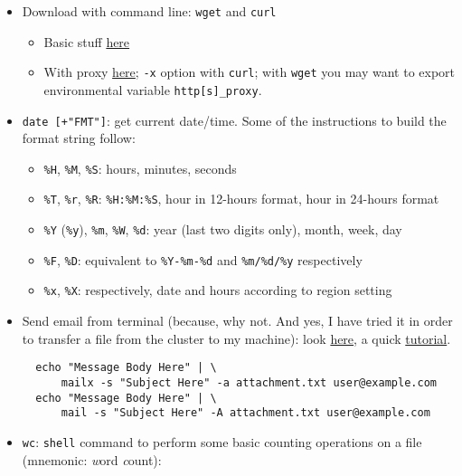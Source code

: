\documentclass[a4paper,12pt,%
              final%
              ]{article}
\begin{document}
\begin{itemize}
\begin{itemize}
\begin{itemize}
        \end{itemize}
    \end{itemize}
  \item Download with command line: \texttt{wget} and \texttt{curl}
    \begin{itemize}
      \item Basic stuff \href{https://linuxconfig.org/download-file-from-url-on-linux-using-command-line}{here}
      \item With proxy \href{https://www.cyberciti.biz/faq/linux-unix-curl-command-with-proxy-username-password-http-options/}{here}; \verb|-x| option with \texttt{curl}; with \texttt{wget} you may want to export environmental variable \verb|http[s]_proxy|.
    \end{itemize}
  \item \verb|date [+"FMT"]|: get current date/time. Some of the instructions to build the format string follow:
    \begin{itemize}
      \item \verb|%H|, \verb|%M|, \verb|%S|: hours, minutes, seconds
      \item \verb|%T|, \verb|%r|, \verb|%R|: \verb|%H:%M:%S|, hour in 12-hours format, hour in 24-hours format
      \item \verb|%Y| (\verb|%y|), \verb|%m|, \verb|%W|, \verb|%d|: year (last two digits only), month, week, day
      \item \verb|%F|, \verb|%D|: equivalent to \verb|%Y-%m-%d| and \verb|%m/%d/%y| respectively
      \item \verb|%x|, \verb|%X|: respectively, date and hours according to region setting
    \end{itemize}
  \item Send email from terminal (because, why not. And yes, I have tried it in order to transfer a file from the cluster to my machine): look \href{https://www.tecmint.com/send-email-attachment-from-linux-commandline/}{here}, a quick \href{https://www.interserver.net/tips/kb/linux-mail-command-usage-examples/}{tutorial}.
\begin{verbatim}
  echo "Message Body Here" | \
      mailx -s "Subject Here" -a attachment.txt user@example.com
  echo "Message Body Here" | \
      mail -s "Subject Here" -A attachment.txt user@example.com
\end{verbatim}
  \item \texttt{wc}: \texttt{shell} command to perform some basic counting operations on a file (mnemonic: \emph{w}ord \emph{c}ount):
\begin{verbatim}

\end{verbatim}
\end{itemize}
\end{document}

